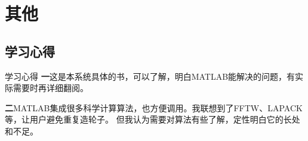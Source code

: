 \documentclass[12pt]{beamer}
\begin{document}
\section{其他}
%		
	\subsection{学习心得}
		\begin{frame}[allowframebreaks]{学习心得}
	\textbf{一}\quad 这是本系统具体的书，可以了解，明白MATLAB能解决的问题，有实际需要时再详细翻阅。
	
	\textbf{二}\quad MATLAB集成很多科学计算算法，也方便调用。我联想到了FFTW、LAPACK等，让用户避免重复造轮子。
	但我认为需要对算法有些了解，定性明白它的长处和不足。
		\end{frame}
\end{document}
